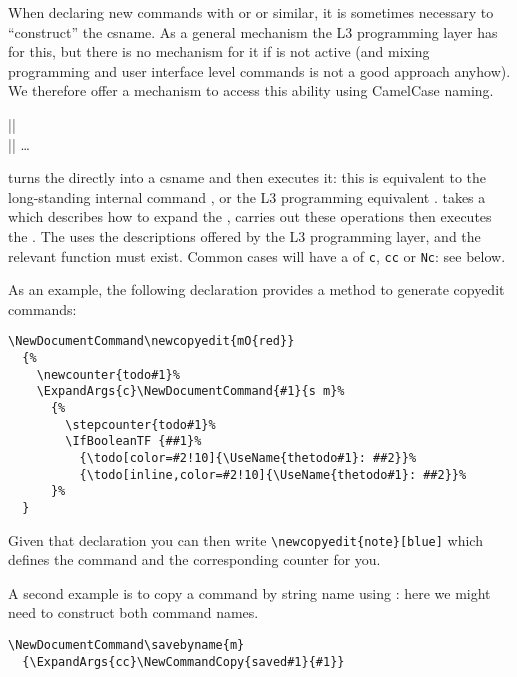 \documentclass{ltxguide}
\begin{document}
When declaring new commands with  or
 or similar, it is sometimes necessary to
``construct'' the csname. As a general mechanism the L3 programming
layer has  for this, but there is no mechanism for
it if  is not active (and mixing programming and user
interface level commands is not a good approach anyhow). We therefore
offer a mechanism to access this ability using CamelCase naming.

\begin{decl}
  |\UseName|   \\
  |\ExpandArgs|    \dots
\end{decl}

 turns the  directly into a csname and
then executes it: this is equivalent to the long-standing
\LaTeXe{} internal command , or the L3 programming
equivalent .  takes a  which
describes how to expand the , carries out these
operations then executes the . The  uses
the descriptions offered by the L3 programming layer, and the
relevant  function must exist. Common cases will
have a  of \texttt{c}, \texttt{cc} or \texttt{Nc}: see below.

As an example, the following declaration provides a method to generate
copyedit commands:
\begin{verbatim}
\NewDocumentCommand\newcopyedit{mO{red}}
  {%
    \newcounter{todo#1}%
    \ExpandArgs{c}\NewDocumentCommand{#1}{s m}%
      {%
        \stepcounter{todo#1}%
        \IfBooleanTF {##1}%
          {\todo[color=#2!10]{\UseName{thetodo#1}: ##2}}%
          {\todo[inline,color=#2!10]{\UseName{thetodo#1}: ##2}}%
      }%
  }
\end{verbatim}
Given that declaration you can then write
\verb/\newcopyedit{note}[blue]/ which defines the command 
and the corresponding counter for you.

A second example is to copy a command by string name using
: here we might need to construct both command
names.
\begin{verbatim}
\NewDocumentCommand\savebyname{m}
  {\ExpandArgs{cc}\NewCommandCopy{saved#1}{#1}}
\end{verbatim}
\end{document}

